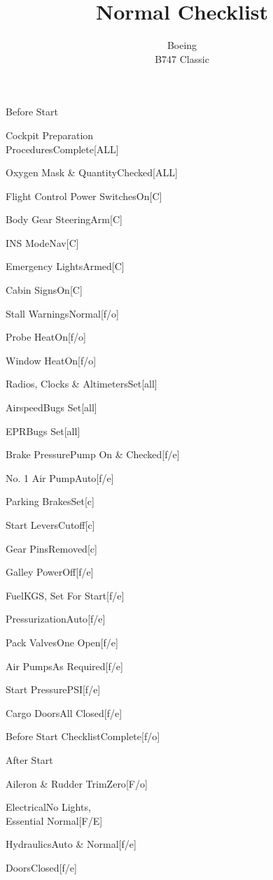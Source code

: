 \documentclass[sim-use, blue_items, halfpage]{checklist}
\title{Normal Checklist}
\subtitle{Boeing \\ B747 Classic}
\begin{document}
\begin{checklist}{Before Start}
	\item{Cockpit Preparation\\Procedures}{Complete}[ALL]
	\item{Oxygen Mask \& Quantity}{Checked}[ALL]
	\item{Flight Control Power Switches}{On}[C]
	\item{Body Gear Steering}{Arm}[C]
	\item{INS Mode}{Nav}[C]
	\item{Emergency Lights}{Armed}[C]
	\item{Cabin Signs}{On}[C]
	\item{Stall Warnings}{Normal}[f/o]
	\item{Probe Heat}{On}[f/o]
	\item{Window Heat}{On}[f/o]
	\item{Radios, Clocks \& Altimeters}{Set}[all]
	\item{Airspeed}{Bugs Set}[all]
	\item{EPR}{Bugs Set}[all]
	\item{Brake Pressure}{Pump On \& Checked}[f/e]
	 {
		\item{No. 1 Air Pump}{Auto}[f/e]
	}
	\item{Parking Brakes}{Set}[c]
	\item{Start Levers}{Cutoff}[c]
	\item{Gear Pins}{Removed}[c]
	\item{Galley Power}{Off}[f/e]
	\item{Fuel}{\blank KGS, Set For Start}[f/e]
	\item{Pressurization}{Auto}[f/e]
	\item{Pack Valves}{One Open}[f/e]
	\item{Air Pumps}{As Required}[f/e]
	\item{Start Pressure}{\blank PSI}[f/e]
	\item{Cargo Doors}{All Closed}[f/e]
	\item{Before Start Checklist}{Complete}[f/o]
\end{checklist}

\begin{checklist}{After Start}
	\item{Aileron \& Rudder Trim}{Zero}[F/o]
	\item{Electrical}{No Lights,\\Essential Normal}[F/E]
	\item{Hydraulics}{Auto \& Normal}[f/e]
	\item{Doors}{Closed}[f/e]
\end{checklist}
\end{document}
